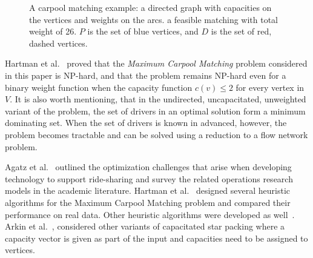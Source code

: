 \documentclass[]{llncs}
\def\CARPOOL{Maximum Carpool Ma\-tching}
\begin{document}
\begin{figure}
{}
\caption[]{
\label{fig:carpool}
A carpool matching example: 
a directed graph with capacities on the vertices and weights on the arcs. 
a feasible matching with total weight of 26.
$P$ is the set of blue vertices, and $D$ is the set of red, dashed vertices. 
}
\end{figure}  

Hartman et al.~\cite{hartman2013optimal} proved that the
\emph{\CARPOOL{}} problem considered in this paper is NP-hard,
and that the problem remains NP-hard even for a binary weight function when
the capacity function $c(v) \leq 2$ for every vertex in $V$.
It is also worth mentioning, that in the undirected, uncapacitated, unweighted
variant of the problem, the set of drivers in an optimal solution
form a minimum dominating set.
When the set of drivers is known in advanced, however, the problem becomes
tractable and can be solved using a reduction to a flow network problem.

Agatz et al.~\cite{agatz2012optimization} outlined the optimization challenges
that arise when developing technology to support ride-sharing and survey the
related operations research models in the academic literature.  
Hartman et al.~\cite{hartman2014theory} designed several heuristic algorithms
for the \CARPOOL{} problem and compared 
their performance on real data.
Other heuristic algorithms were developed as well~\cite{knapen2014exploiting}.
Arkin et al.~\cite{arkin2004approximations}, considered other variants of
capacitated star packing where a capacity vector is given as part of the input and 
capacities need to be assigned to vertices.  
\end{document}
